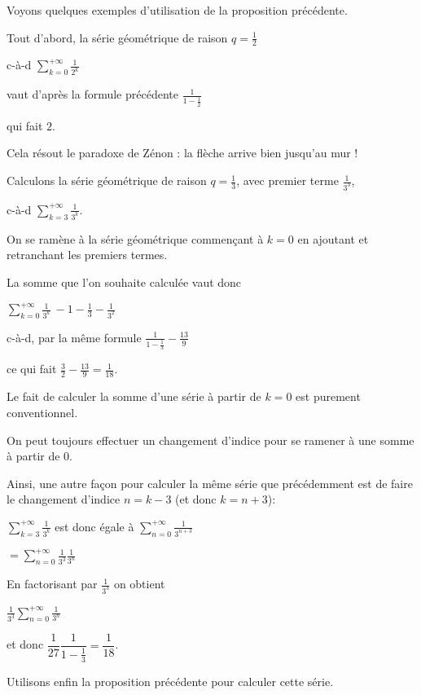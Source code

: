 Voyons quelques exemples d'utilisation de la proposition précédente.

\change
Tout d'abord, la série géométrique de raison $q=\frac 12$

\change
c-à-d $\displaystyle \sum_{k=0}^{+\infty} \frac{1}{2^k}$ 

\change
vaut d'après la formule précédente
$\frac{1}{1-\frac12} $

\change
qui fait $ 2$.

\change
Cela résout le paradoxe de Zénon : la flèche arrive bien jusqu'au mur !

\change
Calculons la série géométrique de raison $q=\frac 13$, avec premier terme $\frac{1}{3^3}$,

\change
c-à-d $\displaystyle \sum_{k=3}^{+\infty} \frac{1}{3^k}$.

On se ramène à la série géométrique commençant à $k=0$ en ajoutant et retranchant les premiers termes.

\change
La somme que l'on souhaite calculée vaut donc 

$ \displaystyle\sum_{k=0}^{+\infty} \frac{1}{3^k} \  -  1 - \frac 13-\frac 1{3^2} $

\change
c-à-d, par la même formule $\frac{1}{1-\frac13} - \frac{13}{9}$

\change
ce qui fait $ \frac32-\frac{13}{9} = \frac{1}{18}$.

Le fait de calculer la somme d'une série à partir de $k=0$ est
purement conventionnel. 

\change
On peut toujours effectuer un changement
d'indice pour se ramener à une somme à partir de $0$. 

\change
Ainsi, une autre façon pour calculer la même série que précédemment
est de faire le changement d'indice $n=k-3$ (et donc $k=n+3$):

\change
$ \displaystyle\sum_{k=3}^{+\infty} \frac{1}{3^k} $ est donc égale à $  \displaystyle\sum_{n=0}^{+\infty} \frac{1}{3^{n+3}}$

\change
$
=  \displaystyle\sum_{n=0}^{+\infty} \frac{1}{3^3}\frac{1}{3^n}$

\change
En factorisant par $\frac{1}{3^3}$ on obtient

$ \frac{1}{3^3} \displaystyle\sum_{n=0}^{+\infty} \frac{1}{3^n}$

\change
et donc
$ \dfrac{1}{27}\dfrac{1}{1-\frac13}= \dfrac{1}{18}$.

\change
Utilisons enfin la proposition précédente pour calculer cette série.

